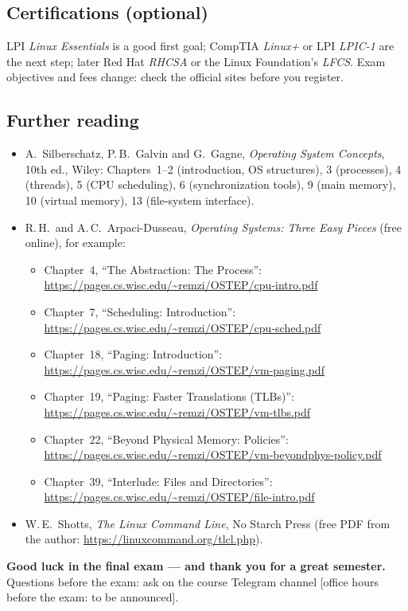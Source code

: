 \documentclass[11pt,a4paper]{article}
\begin{document}
\subsection*{Certifications (optional)}
LPI \emph{Linux Essentials} is a good first goal; CompTIA \emph{Linux+} or LPI \emph{LPIC-1} are the next step; later Red Hat \emph{RHCSA} or the Linux Foundation's \emph{LFCS}. Exam objectives and fees change: check the official sites before you register.

\subsection*{Further reading}
\begin{itemize}
  \item A.\ Silberschatz, P.\,B.\ Galvin and G.\ Gagne, \emph{Operating System Concepts}, 10th ed., Wiley: Chapters~1--2 (introduction, OS structures), 3 (processes), 4 (threads), 5 (CPU scheduling), 6 (synchronization tools), 9 (main memory), 10 (virtual memory), 13 (file-system interface).
  \item R.\,H.\ and A.\,C.\ Arpaci-Dusseau, \emph{Operating Systems: Three Easy Pieces} (free online), for example:
  \begin{itemize}
    \item Chapter~4, ``The Abstraction: The Process'': \url{https://pages.cs.wisc.edu/~remzi/OSTEP/cpu-intro.pdf}
    \item Chapter~7, ``Scheduling: Introduction'': \url{https://pages.cs.wisc.edu/~remzi/OSTEP/cpu-sched.pdf}
    \item Chapter~18, ``Paging: Introduction'': \url{https://pages.cs.wisc.edu/~remzi/OSTEP/vm-paging.pdf}
    \item Chapter~19, ``Paging: Faster Translations (TLBs)'': \url{https://pages.cs.wisc.edu/~remzi/OSTEP/vm-tlbs.pdf}
    \item Chapter~22, ``Beyond Physical Memory: Policies'': \url{https://pages.cs.wisc.edu/~remzi/OSTEP/vm-beyondphys-policy.pdf}
    \item Chapter~39, ``Interlude: Files and Directories'': \url{https://pages.cs.wisc.edu/~remzi/OSTEP/file-intro.pdf}
  \end{itemize}
  \item W.\,E.\ Shotts, \emph{The Linux Command Line}, No Starch Press (free PDF from the author: \url{https://linuxcommand.org/tlcl.php}).
\end{itemize}

\textbf{Good luck in the final exam --- and thank you for a great semester.} Questions before the exam: ask on the course Telegram channel [office hours before the exam: to be announced].
\end{document}
